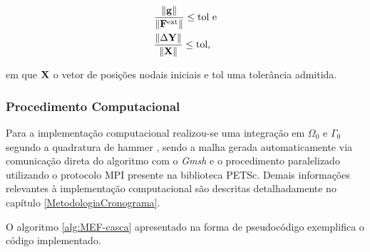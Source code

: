 \begin{subequations}
    \begin{align}
         & \frac{\left\lVert{\mathbf{g}}\right\lVert}{\left\lVert{\mathbf{F}^\text{ext}}\right\lVert}\leq\text{tol e} \\
         & \frac{\left\lVert{\Delta\mathbf{Y}}\right\lVert}{\left\lVert{\mathbf{X}}\right\lVert}\leq\text{tol,}
    \end{align}
    \label{eq:CSD-erro}
\end{subequations}

\noindent em que $\mathbf{X}$ o vetor de posições nodais iniciais e tol uma tolerância admitida.

\subsubsection{Procedimento Computacional} \label{MEFP-Comp}

Para a implementação computacional realizou-se uma integração em $\Omega_0$ e $\Gamma_0$ segundo a quadratura de hammer \cite{hammer1956numerical}, sendo a malha gerada automaticamente via comunicação direta do algoritmo com o \textit{Gmsh} e o procedimento paralelizado utilizando o protocolo MPI presente na biblioteca PETSc. Demais informações relevantes à implementação computacional são descritas detalhadamente no capítulo \ref{MetodologiaCronograma}.

O algoritmo \ref{alg:MEF-casca} apresentado na forma de pseudocódigo exemplifica o código implementado.

